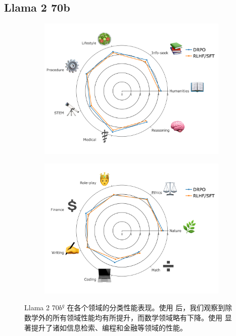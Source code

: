 \subsection{Llama 2 70b}
\begin{figure}[h]
\centering
\begin{subfigure}[b]{.5\textwidth}
  \centering
  \includegraphics[width=0.95\linewidth]{images/llama_1.png}
  \label{fig:cat_llama_1}
\end{subfigure}

\vspace{1em}

\begin{subfigure}[b]{.5\textwidth}
  \centering
  \includegraphics[width=0.95\linewidth]{images/llama_2.png}
  \label{fig:cat_llama_2}
\end{subfigure}
\caption{Llama 2 70$b^q$ 在各个领域的分类性能表现。使用 \ours 后，我们观察到除数学外的所有领域性能均有所提升，而数学领域略有下降。使用 \ours 显著提升了诸如信息检索、编程和金融等领域的性能。}
\label{fig:categorized_performance_llama}
\end{figure}

